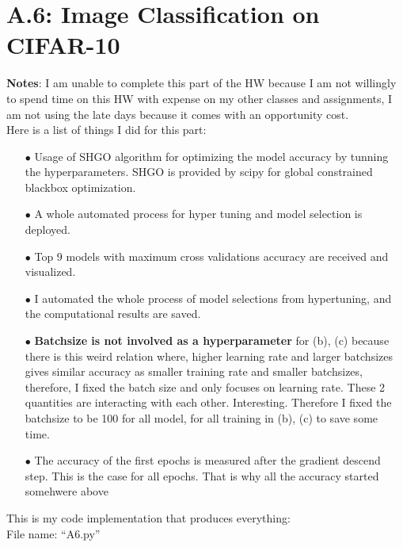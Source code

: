 \documentclass[]{article}
\begin{document}
\section*{A.6: Image Classification on CIFAR-10}
    \textbf{Notes}: 
        I am unable to complete this part of the HW because I am not willingly to spend time on this HW with expense on my other classes and assignments, I am not using the late days because it comes with an opportunity cost. 
        \\
        Here is a list of things I did for this part: 
        \begin{enumerate}
            \item[$\bullet$] Usage of SHGO algorithm for optimizing the model accuracy by tunning the hyperparameters. SHGO is provided by scipy for global constrained blackbox optimization. 
            \item[$\bullet$] A whole automated process for hyper tuning and model selection is deployed. 
            \item[$\bullet$] Top 9 models with maximum cross validations accuracy are received and visualized. 
            \item[$\bullet$] I automated the whole process of model selections from hypertuning, and the computational results are saved.  
            \item[$\bullet$] \textbf{Batchsize is not involved as a hyperparameter} for (b), (c) because there is this weird relation where, higher learning rate and larger batchsizes gives similar accuracy as smaller training rate and smaller batchsizes, therefore, I fixed the batch size and only focuses on learning rate. These 2 quantities are interacting with each other. Interesting. Therefore I fixed the batchsize to be 100 for all model, for all training in (b), (c) to save some time. 
            \item[$\bullet$] The accuracy of the first epochs is measured after the gradient descend step. This is the case for all epochs. That is why all the accuracy started somehwere above 
        \end{enumerate}
        This is my code implementation that produces everything: 
        \\
        File name: ``A6.py''
\end{document}
